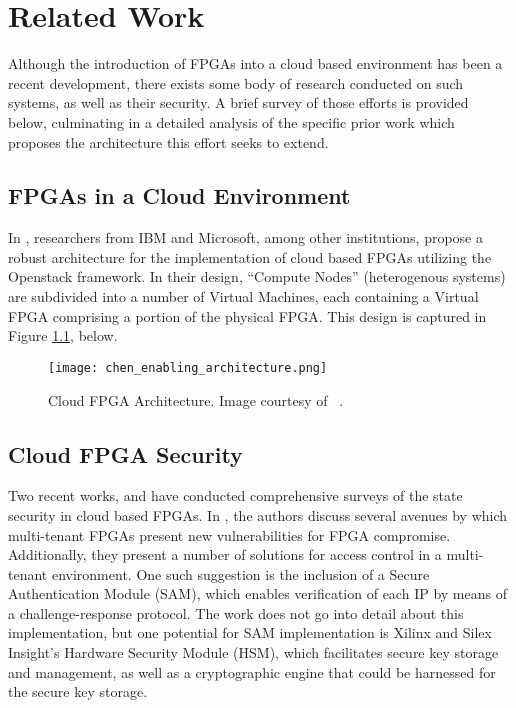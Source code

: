 
\chapter{Related Work}\label{ch:relatedWork}
Although the introduction of FPGAs into a cloud based environment has been a recent development, there exists some body of research conducted on such systems, as well as their security. A brief survey of those efforts is provided below, culminating in a detailed analysis of the specific prior work which proposes the architecture this effort seeks to extend.

\section{FPGAs in a Cloud Environment}\label{sec:fpgaCloud}
In \cite{chen_enabling_2014}, researchers from IBM and Microsoft, among other institutions, propose a robust architecture for the implementation of cloud based FPGAs utilizing the Openstack framework. In their design, ``Compute Nodes'' (heterogenous systems) are subdivided into a number of Virtual Machines, each containing a Virtual FPGA comprising a portion of the physical FPGA. This design is captured in Figure \ref{fig:chen_enabling_architecture}, below.

\begin{figure}
    \centering
    \texttt{[image: chen\_enabling\_architecture.png]}
    \caption[Cloud FPGA Architecture]{Cloud FPGA Architecture. Image courtesy of ~\cite{chen_enabling_2014}.}
    \label{fig:chen_enabling_architecture}
\end{figure}


\section{Cloud FPGA Security}\label{sec:cloudFPGASecurity}
Two recent works, \cite{jin_security_2020} and \cite{turan_trust_2020} have conducted comprehensive surveys of the state security in cloud based FPGAs. In \cite{jin_security_2020}, the authors discuss several avenues by which multi-tenant FPGAs present new vulnerabilities for FPGA compromise. Additionally, they present a number of solutions for access control in a multi-tenant environment. One such suggestion is the inclusion of a Secure Authentication Module (SAM), which enables verification of each IP by means of a challenge-response protocol. The work does not go into detail about this implementation, but one potential for SAM implementation is Xilinx and Silex Insight's Hardware Security Module (HSM), which facilitates secure key storage and management, as well as a cryptographic engine that could be harnessed for the secure key storage.

